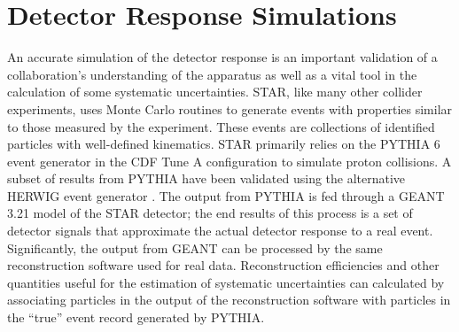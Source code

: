 \section{Detector Response Simulations}

An accurate simulation of the detector response is an important validation of a collaboration's understanding of the apparatus as well as a vital tool in the calculation of some systematic uncertainties. STAR, like many other collider experiments, uses Monte Carlo routines to generate events with properties similar to those measured by the experiment.  These events are collections of identified particles with well-defined kinematics.  STAR primarily relies on the PYTHIA 6 event generator \cite{} in the CDF Tune A \cite{} configuration to simulate proton collisions.  A subset of results from PYTHIA have been validated using the alternative HERWIG event generator \cite{}.  The output from PYTHIA is fed through a GEANT 3.21 \cite{} model of the STAR detector; the end results of this process is a set of detector signals that approximate the actual detector response to a real event.  Significantly, the output from GEANT can be processed by the same reconstruction software used for real data.  Reconstruction efficiencies and other quantities useful for the estimation of systematic uncertainties can calculated by associating particles in the output of the reconstruction software with particles in the ``true'' event record generated by PYTHIA.

